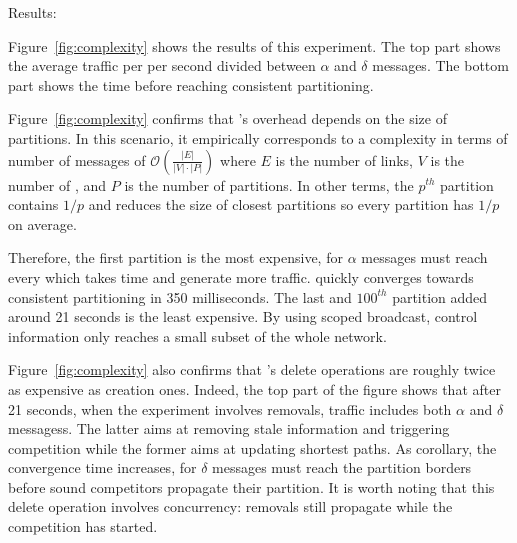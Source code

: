\begin{asparadesc}
\begin{figure}
\end{figure}

\item [Results:]

Figure~\ref{fig:complexity} shows the results of this experiment. The
top part shows the average traffic per \process per second divided
between $\alpha$ and $\delta$ messages. The bottom part shows the time
before reaching consistent partitioning.

\noindent Figure~\ref{fig:complexity} confirms that \NAME's overhead
depends on the size of partitions. In this scenario, it empirically
corresponds to a complexity in terms of number of messages of
$\mathcal{O}(\frac{|E|}{|V|\cdot|P|})$ where $E$ is the number of
links, $V$ is the number of \processes, and $P$ is the number of
partitions. In other terms, the $p^{th}$ partition contains $1/p$
\processes and reduces the size of closest partitions so every
partition has $1/p$ \processes on average.
  
\noindent Therefore, the first partition is the most expensive, for
$\alpha$ messages must reach every \process which takes time and
generate more traffic.  \NAME quickly converges towards consistent
partitioning in 350 milliseconds.
The last and $100^{th}$ partition
added around 21 seconds is the least expensive. By using scoped
broadcast, control information only reaches a small subset of the
whole network.

\noindent Figure~\ref{fig:complexity} also confirms that \NAME's
delete operations are roughly twice as expensive as creation
ones. Indeed, the top part of the figure shows that after 21 seconds,
when the experiment involves removals, traffic includes both
$\alpha$ and $\delta$ messagess. The latter aims at removing stale
information and triggering competition while the former aims at
updating shortest paths. As corollary, the convergence time increases,
for $\delta$ messages must reach the partition borders before sound
competitors propagate their partition. It is worth noting that this
delete operation involves concurrency: removals still propagate while
the competition has started.


\end{asparadesc}
